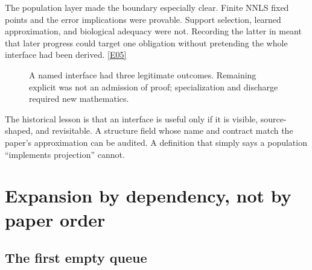 \documentclass[11pt,a4paper]{article}
\newcommand{\artifact}[1]{\texttt{\detokenize{#1}}}
\newcommand{\ev}[1]{%
  \hyperref[ev:#1]{\textcolor{ReportBlue}{\textsf{\scriptsize[#1]}}}}
\begin{document}
The population layer made the boundary especially clear. Finite NNLS fixed points
and the error implications were provable. Support selection, learned approximation,
and biological adequacy were not. Recording the latter in
\artifact{MODEL-OBLIGATIONS.md} meant that later progress could target one obligation
without pretending the whole interface had been derived. \ev{E05}

\begin{figure}[htbp]
\centering
{}
\caption{A named interface had three legitimate outcomes. Remaining explicit was not
an admission of proof; specialization and discharge required new mathematics.}
\label{fig:interfaces}
\end{figure}

The historical lesson is that an interface is useful only if it is visible,
source-shaped, and revisitable. A structure field whose name and contract match the
paper's approximation can be audited. A definition that simply says a population
``implements projection'' cannot.

\newpage
\section{Expansion by dependency, not by paper order}
\label{sec:expansion}

\subsection{The first empty queue}
\end{document}
